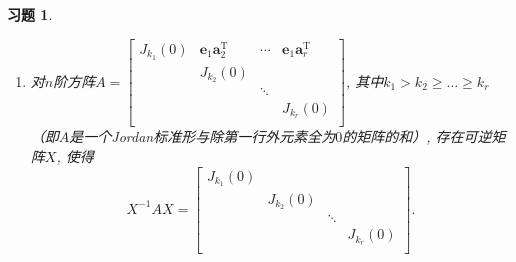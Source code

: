 \documentclass{ctexart}
\newtheorem{exercise}[thm]{习题}
\newcommand\bs[1]{\boldsymbol{ #1}}
\def\zero{O}
\DeclareMathOperator{\T}{T}
\begin{document}
\begin{exercise}
\begin{enumerate}
\[\begin{bmatrix}
I_m & X\\ \zero & I_n\\
\end{bmatrix}^{-1}=\begin{bmatrix}
A_1 & \zero\\ \zero &A_2\\
\end{bmatrix}.
\]
\item \label{itm:exc:jordan-simplify:5}
对$n$阶方阵$A=\begin{bmatrix}
		J_{k_1}(0) & \bs e_1\bs a_2^{\T} & \cdots & \bs  e_1\bs a_r^{\T}\\
		&J_{k_2}(0) \\
		&& \ddots \\
		&&&J_{k_r}(0)\\
	\end{bmatrix}$, 其中$k_1> k_2\ge\dots\ge k_r$（即$A$是一个Jordan标准形与除第一行外元素全为$0$的矩阵的和）, 
存在可逆矩阵$X$, 使得
\[
X^{-1}AX=\begin{bmatrix}
		J_{k_1}(0) \\
		&J_{k_2}(0)  \\
		&& \ddots \\
		&&&J_{k_r}(0)\\
\end{bmatrix}.
\]
\end{enumerate}
\end{exercise}
\end{document}
